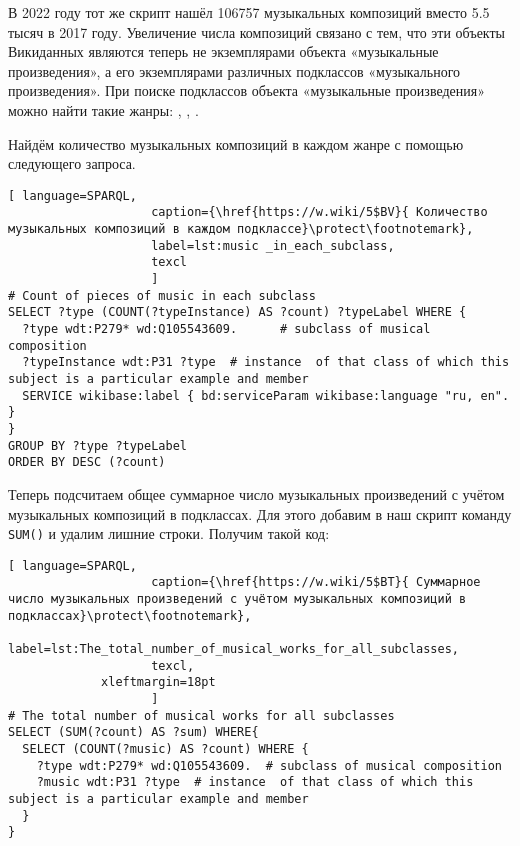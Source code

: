 В 2022 году тот же скрипт нашёл \num{106757} музыкальных композиций вместо \num{5,5} тысяч в 2017 году. Увеличение числа композиций связано с тем, что эти объекты Викиданных являются теперь не экземплярами объекта «музыкальные произведения», а его экземплярами различных подклассов «музыкального произведения». При поиске подклассов объекта «музыкальные произведения» можно найти такие жанры: , , .

Найдём количество музыкальных композиций в каждом жанре с помощью следующего запроса.

\begin{lstlisting}[ language=SPARQL,
                    caption={\href{https://w.wiki/5$BV}{ Количество музыкальных композиций в каждом подклассе}\protect\footnotemark},
                    label=lst:music _in_each_subclass,
                    texcl 
                    ]
# Count of pieces of music in each subclass
SELECT ?type (COUNT(?typeInstance) AS ?count) ?typeLabel WHERE {
  ?type wdt:P279* wd:Q105543609.      # subclass of musical composition
  ?typeInstance wdt:P31 ?type  # instance  of that class of which this subject is a particular example and member
  SERVICE wikibase:label { bd:serviceParam wikibase:language "ru, en". }
}
GROUP BY ?type ?typeLabel
ORDER BY DESC (?count)
\end{lstlisting}%

Теперь подсчитаем общее суммарное число музыкальных произведений с учётом музыкальных композиций в подклассах. Для этого добавим в наш скрипт команду \lstinline|SUM()| и удалим лишние строки. Получим такой код:

\begin{lstlisting}[ language=SPARQL,
                    caption={\href{https://w.wiki/5$BT}{ Суммарное число музыкальных произведений с учётом музыкальных композиций в подклассах}\protect\footnotemark},
                    label=lst:The_total_number_of_musical_works_for_all_subclasses,
                    texcl,
	         xleftmargin=18pt
                    ]
# The total number of musical works for all subclasses 
SELECT (SUM(?count) AS ?sum) WHERE{
  SELECT (COUNT(?music) AS ?count) WHERE {
    ?type wdt:P279* wd:Q105543609.  # subclass of musical composition
    ?music wdt:P31 ?type  # instance  of that class of which this subject is a particular example and member
  }
}
\end{lstlisting}%

